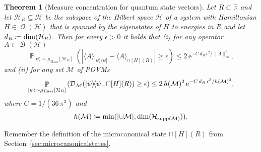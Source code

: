 \documentclass[a4paper,12pt,listof=totoc,index=totoc,bibliography=totoc,headsepline=false,headings=normal,BCOR16.153846mm,DIV12,headinclude,twoside,cleardoublepage=empty,numbers=noenddot,final]{scrreprt}
\theoremstyle{mystyle}
\numberwithin{equation}{section}
\numberwithin{figure}{section}
\numberwithin{lemma}{section}
\newtheorem{theorem}{Theorem}
\numberwithin{theorem}{section}
\numberwithin{corollary}{section}
\numberwithin{definition}{section}
\numberwithin{conjecture}{section}
\numberwithin{observation}{section}
\newcommand{\+}{\mkern2mu}
\newcommand{\coloneqq}{\mathrel{\vcentcolon\mkern-1.2mu=}} %
\newcommand{\union}{\cup}
\renewcommand{\min}{\mathchoice{\operatorname*{min}}{\operatorname*{min}}{\mathrm{min}}{\mathrm{min}}}
\renewcommand{\H}{H}
\newcommand{\rhomc}{{\sqcap}}
\newcommand{\muhaar}{\mu_{\mathrm{Haar}}}
\newcommand{\bra}[1]{\langle #1|}
\newcommand{\ket}[1]{|#1\rangle}
\newcommand{\ketbra}[2]{\ket{#1}\!\bra{#2}}
\newcommand{\ex}[2]{\langle #1 \rangle_{#2}}
\newcommand{\tracedistance}[3][]{
  \ifthenelse{\equal{#2}{}}
  {\ifthenelse{\equal{#3}{}}
    {\mathcal{D}_{#1}}{}
  }{
    \ifthenelse{\equal{#1}{}}
    {\operatorname{\mathcal{D}}(#2,#3)}
    {\operatorname{\mathcal{D}}_{#1}(#2,#3)}
  }
}
\DeclareMathOperator*{\probability}{\mathbb{P}}
\newcommand{\e}{\mathrm{e}}
\DeclareMathOperator{\1}{\mathds{1}}
\newcommand{\POVMs}{\mathcal{M}}
\DeclareMathOperator{\Bop}{\mathcal{B}}
\DeclareMathOperator{\Obs}{\mathcal{O}}
\DeclareMathOperator{\supp}{supp}
\newcommand{\mc}[1]{\mathcal{#1}}
\newcommand{\mcH}{\mc{H}}
\newcommand{\mb}[1]{\mathbb{#1}}
\newcommand{\R}{\mb{R}}
\begin{document}
\begin{theorem}[Measure concentration for quantum state vectors] \label{thm:measureconcentrationforquantumstatevectors}
  Let $R\subset\R$ and let $\mcH_R \subseteq \mcH$ be the subspace of the Hilbert space $\mcH$ of a system with Hamiltonian $\H \in \Obs(\mcH)$ that is spanned by the eigenstates of $\H$ to energies in $R$ and let $d_R \coloneqq \dim(\mcH_R)$.
  Then for every $\epsilon>0$ it holds that (i) for any operator $A \in \Bop(\mcH)$
  \begin{equation} \label{eq:measureconcentrationforobservables}
    \probability_{\ket\psi\sim\muhaar[\mcH_R]}\left( | \ex A {\ketbra\psi\psi} - \ex A {\rhomc[\H](R)} | \geq \epsilon \right) \leq 2\,\e^{-C\,d_R\,\epsilon^2/\|A\|_\infty^2} ,
  \end{equation}
  and (ii) for any set $\POVMs$ of POVMs
  \begin{equation} \label{eq:measureconcentrationforpovms}
    \probability_{\ket\psi\sim\muhaar[\mcH_R]}\left(\tracedistance[\POVMs]{\ketbra\psi\psi}{\rhomc[\H](R)} \geq \epsilon \right) \leq 2\,h(\POVMs)^2\,\e^{-C\,d_R\,\epsilon^2/h(\POVMs)^2} ,
  \end{equation}
  where $C = 1/(36\,\pi^3)$ and
  \begin{equation} \label{eq:definitionofhinthemeasureconcentrationtheorem}
    h(\POVMs) \coloneqq \min(|{\union \POVMs}|, \dim(\mcH_{\supp(\POVMs)})) .
  \end{equation}
\end{theorem}
Remember the definition of the microcanonical state $\rhomc[\H](R)$ from Section~\ref{sec:microcanonicalstates}.
\end{document}
